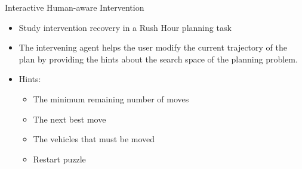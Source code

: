 \begin{frame}{Interactive Human-aware Intervention}
\begin{itemize}
\item Study intervention recovery in a Rush Hour planning task
\item The intervening agent helps the user modify the current trajectory of the plan by providing the hints about the search space of the planning problem.
\item Hints:
\begin{itemize}
\item The minimum remaining number of moves
\item The next best move
\item The vehicles that must be moved
\item Restart puzzle
\end{itemize}
\end{itemize}
\end{frame}